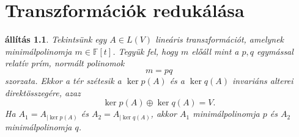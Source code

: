 \documentclass[9pt, a4paper, showtrims]{memoir}
\theoremstyle{plain}
\newtheorem{proposition}{állítás}[chapter]
\theoremstyle{remark}
\theoremstyle{definition}
\begin{document}
\chapter{Transzformációk redukálása}
    \begin{proposition}
        Tekintsünk egy $A\in L\left( V \right)$ lineáris transzformációt,
        amelynek minimálpolinomja $m\in\mathbb{F}\left[ t \right]$.
        Tegyük fel, hogy $m$ előáll mint a $p,q$ egymással relatív prím, normált 
        polinomok
        \[
            m=pq
        \]
        szorzata.
        Ekkor a tér szétesik a 
        $\ker p\left( A \right)$ és a 
        $\ker q\left( A \right)$ invariáns alterei direktösszegére, azaz
        \[
            \ker p\left( A \right)\oplus
            \ker q\left( A \right)=
            V.
        \]
        Ha $A_1=A_{|\ker p\left( A \right)}$ és
        $A_2=A_{|\ker q\left( A \right)}$, akkor $A_1$ minimálpolinomja $p$ és $A_2$ minimálpolinomja $q$.
    \end{proposition}
\end{document}
